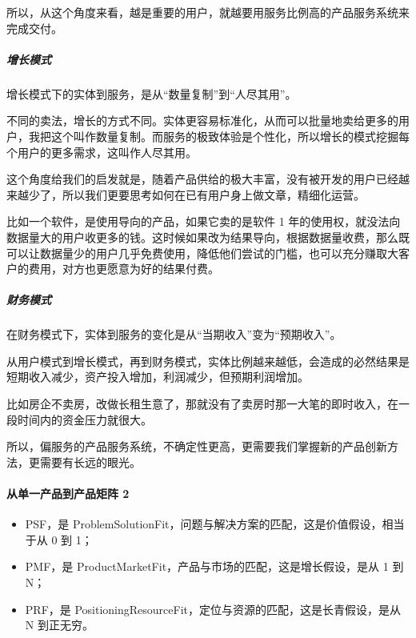 \documentclass[letterpaper,11pt,english]{sphinxmanual}
\begin{document}
所以，从这个角度来看，越是重要的用户，就越要用服务比例高的产品服务系统来完成交付。


\subparagraph{增长模式}
\label{\detokenize{chapter_introduction/Product:id36}}
增长模式下的实体到服务，是从“数量复制”到“人尽其用”。

不同的卖法，增长的方式不同。实体更容易标准化，从而可以批量地卖给更多的用户，我把这个叫作数量复制。而服务的极致体验是个性化，所以增长的模式挖掘每个用户的更多需求，这叫作人尽其用。

这个角度给我们的启发就是，随着产品供给的极大丰富，没有被开发的用户已经越来越少了，所以我们更要思考如何在已有用户身上做文章，精细化运营。

比如一个软件，是使用导向的产品，如果它卖的是软件 1
年的使用权，就没法向数据量大的用户收更多的钱。这时候如果改为结果导向，根据数据量收费，那么既可以让数据量少的用户几乎免费使用，降低他们尝试的门槛，也可以充分赚取大客户的费用，对方也更愿意为好的结果付费。


\subparagraph{财务模式}
\label{\detokenize{chapter_introduction/Product:id37}}
在财务模式下，实体到服务的变化是从“当期收入”变为“预期收入”。

从用户模式到增长模式，再到财务模式，实体比例越来越低，会造成的必然结果是短期收入减少，资产投入增加，利润减少，但预期利润增加。

比如房企不卖房，改做长租生意了，那就没有了卖房时那一大笔的即时收入，在一段时间内的资金压力就很大。

所以，偏服务的产品服务系统，不确定性更高，更需要我们掌握新的产品创新方法，更需要有长远的眼光。


\paragraph{从单一产品到产品矩阵 2\sphinxfootnotemark[26]}
\label{\detokenize{chapter_introduction/Product:id38}}%
\begin{footnotetext}[26]\sphinxAtStartFootnote
{}
%
\end{footnotetext}\ignorespaces \begin{itemize}
\item {} 
PSF，是
Problem\sphinxhyphen{}Solution\sphinxhyphen{}Fit，问题与解决方案的匹配，这是价值假设，相当于从 0
到 1；

\item {} 
PMF，是 Product\sphinxhyphen{}Market\sphinxhyphen{}Fit，产品与市场的匹配，这是增长假设，是从 1 到
N；

\item {} 
PRF，是
Positioning\sphinxhyphen{}Resource\sphinxhyphen{}Fit，定位与资源的匹配，这是长青假设，是从 N
到正无穷。

\end{itemize}
\end{document}
